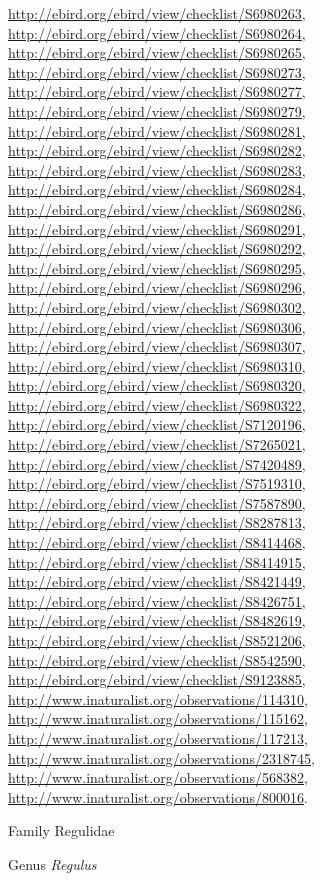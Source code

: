 \documentclass[9pt, article]{memoir}
\begin{document}
\begin{multicols}{2}
\url{http://ebird.org/ebird/view/checklist/S6980263}, 
\url{http://ebird.org/ebird/view/checklist/S6980264}, 
\url{http://ebird.org/ebird/view/checklist/S6980265}, 
\url{http://ebird.org/ebird/view/checklist/S6980273}, 
\url{http://ebird.org/ebird/view/checklist/S6980277}, 
\url{http://ebird.org/ebird/view/checklist/S6980279}, 
\url{http://ebird.org/ebird/view/checklist/S6980281}, 
\url{http://ebird.org/ebird/view/checklist/S6980282}, 
\url{http://ebird.org/ebird/view/checklist/S6980283}, 
\url{http://ebird.org/ebird/view/checklist/S6980284}, 
\url{http://ebird.org/ebird/view/checklist/S6980286}, 
\url{http://ebird.org/ebird/view/checklist/S6980291}, 
\url{http://ebird.org/ebird/view/checklist/S6980292}, 
\url{http://ebird.org/ebird/view/checklist/S6980295}, 
\url{http://ebird.org/ebird/view/checklist/S6980296}, 
\url{http://ebird.org/ebird/view/checklist/S6980302}, 
\url{http://ebird.org/ebird/view/checklist/S6980306}, 
\url{http://ebird.org/ebird/view/checklist/S6980307}, 
\url{http://ebird.org/ebird/view/checklist/S6980310}, 
\url{http://ebird.org/ebird/view/checklist/S6980320}, 
\url{http://ebird.org/ebird/view/checklist/S6980322}, 
\url{http://ebird.org/ebird/view/checklist/S7120196}, 
\url{http://ebird.org/ebird/view/checklist/S7265021}, 
\url{http://ebird.org/ebird/view/checklist/S7420489}, 
\url{http://ebird.org/ebird/view/checklist/S7519310}, 
\url{http://ebird.org/ebird/view/checklist/S7587890}, 
\url{http://ebird.org/ebird/view/checklist/S8287813}, 
\url{http://ebird.org/ebird/view/checklist/S8414468}, 
\url{http://ebird.org/ebird/view/checklist/S8414915}, 
\url{http://ebird.org/ebird/view/checklist/S8421449}, 
\url{http://ebird.org/ebird/view/checklist/S8426751}, 
\url{http://ebird.org/ebird/view/checklist/S8482619}, 
\url{http://ebird.org/ebird/view/checklist/S8521206}, 
\url{http://ebird.org/ebird/view/checklist/S8542590}, 
\url{http://ebird.org/ebird/view/checklist/S9123885}, 
\url{http://www.inaturalist.org/observations/114310}, 
\url{http://www.inaturalist.org/observations/115162}, 
\url{http://www.inaturalist.org/observations/117213}, 
\url{http://www.inaturalist.org/observations/2318745}, 
\url{http://www.inaturalist.org/observations/568382}, 
\url{http://www.inaturalist.org/observations/800016}.

\vspace{6pt}\noindent\hspace{24pt}Family Regulidae


\vspace{6pt}\noindent\hspace{30pt}Genus \textit{Regulus}



\end{multicols}
\end{document}
